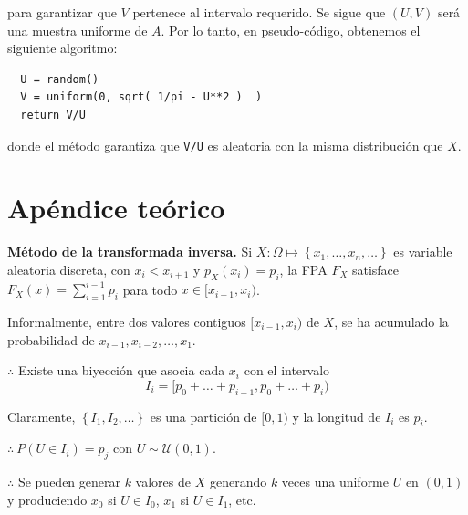 \documentclass[a4paper, 12pt]{article}
\begin{document}
para garantizar que $V$ pertenece al intervalo requerido. Se sigue que $(U, V)$
será una muestra uniforme de $A$. Por lo tanto, en pseudo-código, obtenemos el
siguiente algoritmo:

\begin{verbatim}
  U = random()
  V = uniform(0, sqrt( 1/pi - U**2 )  )
  return V/U
\end{verbatim}

donde el método garantiza que \texttt{V/U} es aleatoria con la misma
distribución que $X$.






















\pagebreak
\section{Apéndice teórico}

\begin{myframe}
  \textbf{Método de la transformada inversa.} Si $X : \Omega \mapsto \left\{
  x_1, \ldots, x_n, \ldots \right\} $ es variable aleatoria
  discreta, con $x_i < x_{i+1}$ y $p_X(x_i) = p_i$, la FPA $F_X$ satisface
  $F_X(x) = \sum_{i=1}^{i-1} p_i$ para todo $x \in [x_{i-1}, x_i)$.

  Informalmente, entre dos valores contiguos $[x_{i-1}, x_i)$ de $X$, se ha acumulado
  la probabilidad de $x_{i-1}, x_{i-2}, \ldots, x_1$.

  $\therefore $ Existe una biyección que asocia cada $x_i$ con el intervalo 
  $$I_i = [p_0 + \ldots + p_{i-1}, p_0 + \ldots + p_i)$$

  Claramente, $\left\{ I_1, I_2, \ldots \right\} $ es una partición de $[0, 1)$ 
  y la longitud de $I_i$ es $p_i$. 

  $\therefore ~ P(U \in I_i) = p_j$ con $U \sim \mathcal{U}(0, 1)$.

  $\therefore $ Se pueden generar $k$ valores de $X$ generando $k$ veces una
  uniforme $U$ en $(0, 1)$ y produciendo $x_0$ si $U \in I_0$, $x_1$ si $U \in
  I_1$, etc.
\end{myframe}

\pagebreak 
\end{document}
